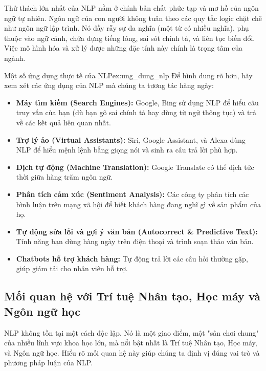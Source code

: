 Thử thách lớn nhất của NLP nằm ở chính bản chất phức tạp và mơ hồ của ngôn ngữ tự nhiên. Ngôn ngữ của con người không tuân theo các quy tắc logic chặt chẽ như ngôn ngữ lập trình. Nó đầy rẫy sự đa nghĩa (một từ có nhiều nghĩa), phụ thuộc vào ngữ cảnh, chứa đựng tiếng lóng, sai sót chính tả, và liên tục biến đổi. Việc mô hình hóa và xử lý được những đặc tính này chính là trọng tâm của ngành.

\begin{example}{Một số ứng dụng thực tế của NLP}{ex:ung_dung_nlp}
    Để hình dung rõ hơn, hãy xem xét các ứng dụng của NLP mà chúng ta tương tác hàng ngày:
    \begin{itemize}
        \item \textbf{Máy tìm kiếm (Search Engines):} Google, Bing sử dụng NLP để hiểu câu truy vấn của bạn (dù bạn gõ sai chính tả hay dùng từ ngữ thông tục) và trả về các kết quả liên quan nhất.
        \item \textbf{Trợ lý ảo (Virtual Assistants):} Siri, Google Assistant, và Alexa dùng NLP để hiểu mệnh lệnh bằng giọng nói và sinh ra câu trả lời phù hợp.
        \item \textbf{Dịch tự động (Machine Translation):} Google Translate có thể dịch tức thời giữa hàng trăm ngôn ngữ.
        \item \textbf{Phân tích cảm xúc (Sentiment Analysis):} Các công ty phân tích các bình luận trên mạng xã hội để biết khách hàng đang nghĩ gì về sản phẩm của họ.
        \item \textbf{Tự động sửa lỗi và gợi ý văn bản (Autocorrect \& Predictive Text):} Tính năng bạn dùng hàng ngày trên điện thoại và trình soạn thảo văn bản.
        \item \textbf{Chatbots hỗ trợ khách hàng:} Tự động trả lời các câu hỏi thường gặp, giúp giảm tải cho nhân viên hỗ trợ.
    \end{itemize}
\end{example}

\subsection{Mối quan hệ với Trí tuệ Nhân tạo, Học máy và Ngôn ngữ học}
\label{ssec:moi_quan_he}

NLP không tồn tại một cách độc lập. Nó là một giao điểm, một "sân chơi chung" của nhiều lĩnh vực khoa học lớn, mà nổi bật nhất là Trí tuệ Nhân tạo, Học máy, và Ngôn ngữ học. Hiểu rõ mối quan hệ này giúp chúng ta định vị đúng vai trò và phương pháp luận của NLP.

